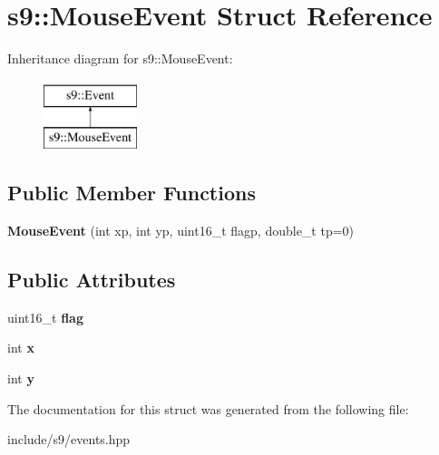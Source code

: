 \hypertarget{structs9_1_1MouseEvent}{\section{s9\-:\-:\-Mouse\-Event \-Struct \-Reference}
\label{structs9_1_1MouseEvent}
}
\-Inheritance diagram for s9\-:\-:\-Mouse\-Event\-:\begin{figure}[H]
\begin{center}
\leavevmode
\includegraphics[height=2.000000cm]{structs9_1_1MouseEvent}
\end{center}
\end{figure}
\subsection*{\-Public \-Member \-Functions}
\begin{DoxyCompactItemize}
\item 
\hypertarget{structs9_1_1MouseEvent_a6c322745d37eff9f2630966a441864a9}{{\bfseries \-Mouse\-Event} (int xp, int yp, uint16\-\_\-t flagp, double\-\_\-t tp=0)}\label{structs9_1_1MouseEvent_a6c322745d37eff9f2630966a441864a9}

\end{DoxyCompactItemize}
\subsection*{\-Public \-Attributes}
\begin{DoxyCompactItemize}
\item 
\hypertarget{structs9_1_1MouseEvent_a0b106ab9a2d2accf265133ae7c586eea}{uint16\-\_\-t {\bfseries flag}}\label{structs9_1_1MouseEvent_a0b106ab9a2d2accf265133ae7c586eea}

\item 
\hypertarget{structs9_1_1MouseEvent_a75da38ef356413ed9c3d4c18a75158dc}{int {\bfseries x}}\label{structs9_1_1MouseEvent_a75da38ef356413ed9c3d4c18a75158dc}

\item 
\hypertarget{structs9_1_1MouseEvent_a485ee096b9dc3569db470172a5b8f015}{int {\bfseries y}}\label{structs9_1_1MouseEvent_a485ee096b9dc3569db470172a5b8f015}

\end{DoxyCompactItemize}


\-The documentation for this struct was generated from the following file\-:\begin{DoxyCompactItemize}
\item 
include/s9/events.\-hpp\end{DoxyCompactItemize}

